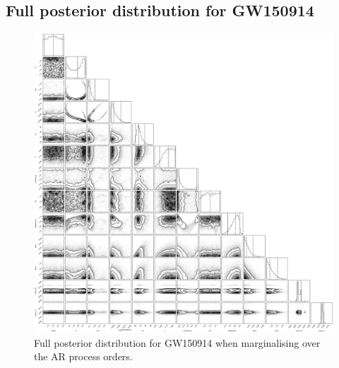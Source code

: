 \documentclass{aa}
\begin{document}
\begin{appendix}
\section{Full posterior distribution for GW150914} \label{sec:appendix_b}
\begin{figure}
	\caption{Full posterior distribution for GW150914 when marginalising over the AR process orders.}
	\label{fig:gw150914_full_pe}
	\includegraphics[width=\textwidth,keepaspectratio]{Images/gw150914/mega_plot.pdf}
\end{figure}
\end{appendix}
\end{document}
